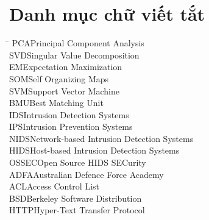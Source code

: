\documentclass[12pt,a4paper]{report}
\begin{document}
 



\tableofcontents
\pagebreak
\listoffigures
\pagebreak 
\listoftables  
\pagebreak

\chapter*{Danh mục chữ viết tắt}
\thispagestyle{plain} 
\begin{tabbing}
\hspace{3cm}\= \kill
PCA\>Principal Component Analysis\\
SVD\>Singular Value Decomposition\\
EM\>Expectation Maximization\\
SOM\>Self Organizing Maps\\
SVM\>Support Vector Machine\\
BMU\>Best Matching Unit\\
IDS\>Intrusion Detection Systems\\
IPS\>Intrusion Prevention Systems\\
NIDS\>Network-based Intrusion Detection Systems\\
HIDS\>Host-based Intrusion Detection Systems\\
OSSEC\>Open Source HIDS SECurity\\
ADFA\>Australian Defence Force Academy\\
ACL\>Access Control List\\
BSD\>Berkeley Software Distribution\\
HTTP\>Hyper-Text Transfer Protocol
\end{tabbing}

\pagebreak 


 





\end{document}
